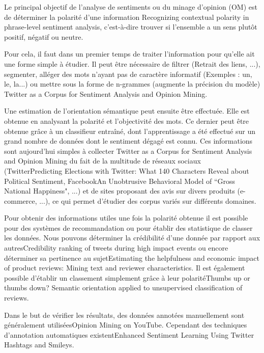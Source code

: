 \documentclass[8pt]{article}
\begin{document}
\begin{multicols}{2}
\par Le principal objectif de l’analyse de sentiments ou du minage d’opinion (OM) est de déterminer la polarité d’une information {Recognizing contextual polarity in phrase-level sentiment analysis}, c’est-à-dire trouver si l’ensemble a un sens plutôt positif, négatif ou neutre.
\par Pour cela, il faut dans un premier temps de traiter l’information pour qu’elle ait une forme simple à étudier. Il peut être nécessaire de filtrer (Retrait des liens, ...), segmenter, alléger des mots n’ayant pas de caractère informatif (Exemples : un, le, la...) ou mettre sous la forme de n-grammes (augmente la précision du modèle) {Twitter as a Corpus for Sentiment Analysis and Opinion Mining}.
\par Une estimation de l’orientation sémantique peut ensuite être effectuée. Elle est obtenue en analysant la polarité et l’objectivité des mots. Ce dernier peut être obtenue grâce à un classifieur entraîné, dont l’apprentissage a été effectué sur un grand nombre de données dont le sentiment dégagé est connu. Ces informations sont aujourd’hui  simples à collecter {Twitter as a Corpus for Sentiment Analysis and Opinion Mining} du fait de la multitude de réseaux sociaux (Twitter{Predicting Elections with Twitter: What 140 Characters Reveal about Political Sentiment}, Facebook{An Unobtrusive Behavioral Model of “Gross National Happiness"}, ...) et de sites proposant des avis sur divers produits (e-commerce, ...), ce qui permet d’étudier des corpus variés sur différents domaines.
\par Pour obtenir des informations utiles une fois la polarité obtenue il est possible pour des systèmes de recommandation ou pour établir des statistique de classer les données. Nous pouvons déterminer la crédibilité d’une donnée par rapport aux autres{Credibility ranking of tweets during high impact events} ou encore déterminer sa pertinence au sujet{Estimating the helpfulness and economic impact of product reviews: Mining text and reviewer characteristics}. Il est également possible d’établir un classement  simplement grâce à leur polarité{Thumbs up or thumbs down? Semantic orientation applied to unsupervised classification of reviews}.
\par Dans le but de vérifier les résultats, des données annotées manuellement sont généralement utilisées{Opinion Mining on YouTube}. Cependant des techniques d’annotation automatiques existent{Enhanced Sentiment Learning Using Twitter Hashtags and Smileys}.


\end{multicols}
\end{document}
